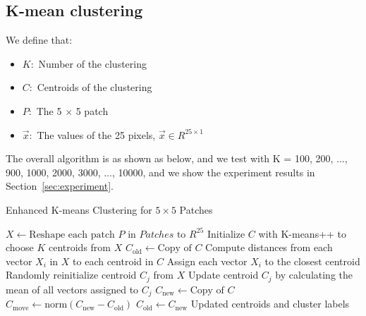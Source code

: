 \documentclass{article}
\begin{document}
\subsection{K-mean clustering}

We define that:

\begin{itemize}
    \item $K:$ Number of the clustering 
    \item $C:$ Centroids of the clustering
    \item $P:$ The 5 $\times$ 5 patch
    \item $\vec{x}: $ The values of the 25 pixels, $\vec{x} \in R^{25 \times 1}$
\end{itemize}


\vspace{2mm}

The overall algorithm is as shown as below, and we test with K = 100, 200, ..., 900, 1000, 2000, 3000, ..., 10000, and we show the experiment results in Section~\ref{sec:experiment}.

\begin{algorithm}
\caption{Enhanced K-means Clustering for $5 \times 5$ Patches}
\begin{algorithmic}[1]
    \State $X \gets \text{Reshape each patch } P \text{ in } Patches \text{ to } R^{25}$ 
    \State Initialize $C$ with K-means++ to choose $K$ centroids from $X$
    \State $C_{\text{old}} \gets \text{Copy of } C$
    \Repeat
        \State Compute distances from each vector $X_i$ in $X$ to each centroid in $C$
        \State Assign each vector $X_i$ to the closest centroid
                \State Randomly reinitialize centroid $C_j$ from $X$
            \Else
                \State Update centroid $C_j$ by calculating the mean of all vectors assigned to $C_j$
            \EndIf
        \EndFor
        \State $C_{\text{new}} \gets \text{Copy of } C$
        \State $C_{\text{move}} \gets \text{norm}(C_{\text{new}} - C_{\text{old}})$
        \State $C_{\text{old}} \gets C_{\text{new}}$
    \State \Return Updated centroids and cluster labels
\EndProcedure
\end{algorithmic}
\end{algorithm}



\vspace{2mm}
\end{document}
